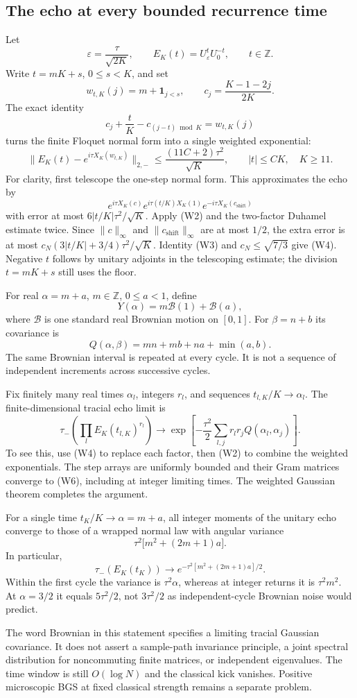 \subsection{The echo at every bounded recurrence time}
Let
\[
 \varepsilon=\frac{\tau}{\sqrt{2K}},\qquad
 E_K(t)=U_\varepsilon^tU_0^{-t},\qquad t\in\mathbb Z.
\]
Write $t=mK+s$, $0\leq s<K$, and set
\[
 w_{t,K}(j)=m+\mathbf1_{j<s},\qquad
 c_j=\frac{K-1-2j}{2K}.
\]
The exact identity
\[
 c_j+\frac tK-c_{(j-t)\bmod K}=w_{t,K}(j)\tag{W3}
\]
turns the finite Floquet normal form into a single weighted exponential:
\[
 \|E_K(t)-e^{i\tau X_K(w_{t,K})}\|_{2,-}
 \leq\frac{(11C+2)\tau^2}{\sqrt K},
 \qquad |t|\leq CK,\quad K\geq11.\tag{W4}
\]
For clarity, first telescope the one-step normal form. This approximates
the echo by
\[
 e^{i\tau X_K(c)}
 e^{i\tau(t/K)X_K(1)}
 e^{-i\tau X_K(c_{\mathrm{shift}})}
\]
with error at most $6|t/K|\tau^2/\sqrt K$. Apply (W2) and the two-factor
Duhamel estimate twice. Since $\|c\|_\infty$ and
$\|c_{\mathrm{shift}}\|_\infty$ are at most $1/2$, the extra error is at
most $c_N(3|t/K|+3/4)\tau^2/\sqrt K$. Identity (W3) and
$c_N\leq\sqrt{7/3}$ give (W4). Negative $t$ follows by unitary adjoints
in the telescoping estimate; the division $t=mK+s$ still uses the floor.

For real $\alpha=m+a$, $m\in\mathbb Z$, $0\leq a<1$, define
\[
 Y(\alpha)=m\mathcal B(1)+\mathcal B(a),\tag{W5}
\]
where $\mathcal B$ is one standard real Brownian motion on $[0,1]$.
For $\beta=n+b$ its covariance is
\[
 Q(\alpha,\beta)=mn+mb+na+\min(a,b).\tag{W6}
\]
The same Brownian interval is repeated at every cycle. It is not a sequence
of independent increments across successive cycles.

Fix finitely many real times $\alpha_l$, integers $r_l$, and sequences
$t_{l,K}/K\to\alpha_l$. The finite-dimensional tracial echo limit is
\[
 \tau_-\!\left(\prod_l E_K(t_{l,K})^{r_l}\right)
 \longrightarrow
 \exp\!\left[-\frac{\tau^2}{2}
     \sum_{l,j}r_lr_jQ(\alpha_l,\alpha_j)\right].\tag{W7}
\]
To see this, use (W4) to replace each factor, then (W2) to combine the
weighted exponentials. The step arrays are uniformly bounded and their
Gram matrices converge to (W6), including at integer limiting times.
The weighted Gaussian theorem completes the argument.

For a single time $t_K/K\to\alpha=m+a$, all integer moments of the unitary
echo converge to those of a wrapped normal law with angular variance
\[
 \tau^2\bigl[m^2+(2m+1)a\bigr].\tag{W8}
\]
In particular,
\[
 \tau_-(E_K(t_K))\longrightarrow
 e^{-\tau^2[m^2+(2m+1)a]/2}.
\]
Within the first cycle the variance is $\tau^2\alpha$, whereas at integer
returns it is $\tau^2m^2$. At $\alpha=3/2$ it equals $5\tau^2/2$, not
$3\tau^2/2$ as independent-cycle Brownian noise would predict.

The word Brownian in this statement specifies a limiting tracial Gaussian
covariance. It does not assert a sample-path invariance principle, a joint
spectral distribution for noncommuting finite matrices, or independent
eigenvalues. The time window is still $O(\log N)$ and the classical kick
vanishes. Positive microscopic BGS at fixed classical strength remains a
separate problem.

